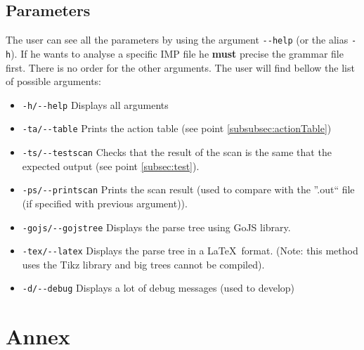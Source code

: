 \documentclass[a4paper,11pt]{article}
\begin{document}
  \subsection{Parameters}
    \label{subsec:parameters}
    The user can see all the parameters by using the argument \verb|--help| (or the alias \verb|-h|).  If he wants to analyse a specific IMP file he \textbf{must} precise the grammar file first. There is no order for the other arguments. The user will find bellow the list of possible arguments:
    \begin{itemize}
      \item \verb|-h/--help| Displays all arguments
      \item \verb|-ta/--table| Prints the action table (see point \ref{subsubsec:actionTable})
      \item \verb|-ts/--testscan| Checks that the result of the scan is the same that the expected output (see point \ref{subsec:test}).
      \item \verb|-ps/--printscan| Prints the scan result (used to compare with the ''.out`` file (if specified with previous argument)).
      \item \verb|-gojs/--gojstree| Displays the parse tree using GoJS library.
      \item \verb|-tex/--latex| Displays the parse tree in a \LaTeX\ format. (Note: this method uses the Tikz library and big trees cannot be compiled).
      \item \verb|-d/--debug| Displays a lot of debug messages (used to develop)
    \end{itemize}
    
\newpage
\appendix
{}

\section{Annex}
\end{document}
